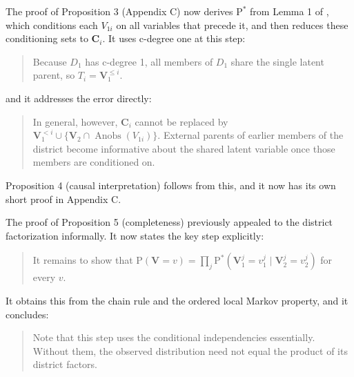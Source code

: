 \documentclass{article}
\def\Pr{{\mathrm{P}}}
\def\Pdo{{\mathrm{P}^*}}
\DeclareMathOperator{\Anobs}{Anobs}
\newcommand{\bV}{\boldsymbol{V}}
\begin{document}
\begin{enumerate}
\begin{mdframed}
        The proof of Proposition 3 (Appendix C) now derives $\Pdo$ from Lemma 1 of \citet{tian2002identification}, which conditions each $V_{1i}$ on all variables that precede it, and then reduces these conditioning sets to $\boldsymbol{C}_i$. It uses c-degree one at this step:
        \begin{quote}
        Because $D_1$ has c-degree 1, all members of $D_1$ share the single latent parent, so $T_i = \bV_1^{\leq i}$.
        \end{quote}
        and it addresses the error directly:
        \begin{quote}
        In general, however, $\boldsymbol{C}_i$ cannot be replaced by $\bV_1^{<i} \cup \{\bV_2 \cap \Anobs(V_{1i})\}$. External parents of earlier members of the district become informative about the shared latent variable once those members are conditioned on.
        \end{quote}
        Proposition 4 (causal interpretation) follows from this, and it now has its own short proof in Appendix C.

The proof of Proposition 5 (completeness) previously appealed to the district factorization informally. It now states the key step explicitly:
        \begin{quote}
        It remains to show that $\Pr(\bV = v) = \prod_{j} \Pdo(\bV_1^j = v^j_1 \mid \bV_2^j = v^j_2)$ for every $v$.
        \end{quote}
        It obtains this from the chain rule and the ordered local Markov property, and it concludes:
        \begin{quote}
        Note that this step uses the conditional independencies essentially. Without them, the observed distribution need not equal the product of its district factors.
        \end{quote}


\end{mdframed}
\end{enumerate}
\end{document}

